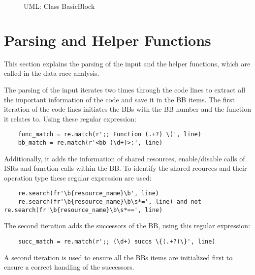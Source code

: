\documentclass[
fancyheadings, %
%
%
]{stsreprt}
\begin{document}
{\begin{figure}[H]
	\caption{UML: Class BasicBlock}
	\label{uml}
\end{figure}

\section{Parsing and Helper Functions}
This section explains the parsing of the input and the helper functions, which are called in the data race analysis.

The parsing of the input iterates two times through the code lines to extract all the important information of the code and save it in the \ac{BB} items. The first iteration of the code lines initiates the \acp{BB} with the \ac{BB} number and the function it relates to.
Using these regular expression:
\begin{lstlisting}
	func_match = re.match(r';; Function (.+?) \(', line)
	bb_match = re.match(r'<bb (\d+)>:', line)
\end{lstlisting}
Additionally, it adds the information of shared resources, enable/disable calls of \acp{ISR} and function calls within the \ac{BB}.
To identify the shared reources and their operation type these regular expression are used:
\begin{lstlisting}
	re.search(fr'\b{resource_name}\b', line)
	re.search(fr'\b{resource_name}\b\s*=', line) and not re.search(fr'\b{resource_name}\b\s*==', line)
\end{lstlisting}
The second iteration adds the successors of the \ac{BB}, using this regular expression:
\begin{lstlisting}
	succ_match = re.match(r';; (\d+) succs \{(.+?)\}', line)
\end{lstlisting}
A second iteration is used to ensure all the \acp{BB} items are initialized first to ensure a correct handling of the successors.

}
\end{document}
